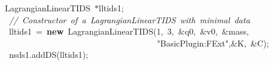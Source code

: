 {\ttfamily \raggedright \small
\ LagrangianLinearTIDS\ $\ast$lltids1;\\
\ \ \textsl{//\ Constructor\ of\ a\ LagrangianLinearTIDS\ with\ minimal\ data\ }\\
\ \ lltids1\ =\ \textbf{new}\ LagrangianLinearTIDS(1,\ 3,\ \&q0,\ \&v0,\ \&mass,\\
\ \ \ \ \ \ \ \ \ \ \ \ \ \ \ \ \ \ \ \ \ \ \ \ \ \ \ \ \ \ \ \ \ \ \ \ \ "{}BasicPlugin:FExt"{},\&K,\ \&C);\\
\ \ nsds1.addDS(lltids1);\\
\ \\
 }
\normalfont\normalsize

